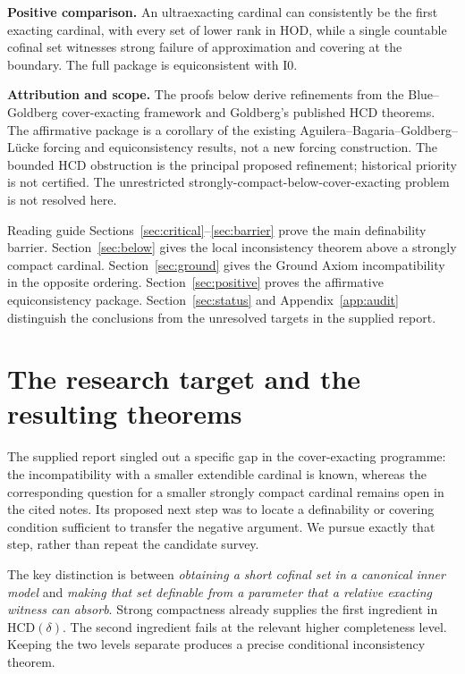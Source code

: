 \documentclass[11pt,letterpaper]{article}
\theoremstyle{definition}
\newcommand{\Izero}{\mathrm{I0}}
\newcommand{\HCD}{\mathrm{HCD}}
\begin{document}
\textbf{Positive comparison.} An ultraexacting cardinal can consistently be the
first exacting cardinal, with every set of lower rank in HOD, while a single
countable cofinal set witnesses strong failure of approximation and covering
at the boundary. The full package is equiconsistent with $\Izero$.

\textbf{Attribution and scope.} The proofs below derive refinements from the
Blue--Goldberg cover-exacting framework and Goldberg's published HCD theorems.
The affirmative package is a corollary of the existing Aguilera--Bagaria--Goldberg--L\"ucke
forcing and equiconsistency results, not a new forcing construction. The bounded
HCD obstruction is the principal proposed refinement; historical priority is
not certified. The unrestricted strongly-compact-below-cover-exacting problem
is not resolved here.

\clearpage
\tableofcontents
\vspace{10pt}
\begin{assessment}{Reading guide}
Sections~\ref{sec:critical}--\ref{sec:barrier} prove the main definability barrier.
Section~\ref{sec:below} gives the local inconsistency theorem above a strongly compact cardinal.
Section~\ref{sec:ground} gives the Ground Axiom incompatibility in the opposite ordering.
Section~\ref{sec:positive} proves the affirmative equiconsistency package.
Section~\ref{sec:status} and Appendix~\ref{app:audit} distinguish the conclusions
from the unresolved targets in the supplied report.
\end{assessment}

\section{The research target and the resulting theorems}\label{sec:overview}

The supplied report singled out a specific gap in the cover-exacting programme:
the incompatibility with a smaller extendible cardinal is known, whereas the
corresponding question for a smaller strongly compact cardinal remains open in
the cited notes. Its proposed next step was to locate a definability or covering
condition sufficient to transfer the negative argument. We pursue exactly that
step, rather than repeat the candidate survey. \cite{previous,cover}

The key distinction is between \emph{obtaining a short cofinal set in a canonical
inner model} and \emph{making that set definable from a parameter that a relative
exacting witness can absorb}. Strong compactness already supplies the first
ingredient in $\HCD(\delta)$. The second ingredient fails at the relevant higher
completeness level. Keeping the two levels separate produces a precise
conditional inconsistency theorem.
\end{document}
